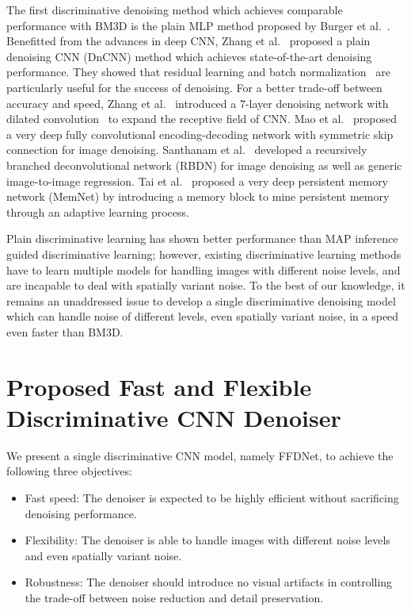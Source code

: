 \documentclass[journal]{IEEEtran}
\begin{document}
The first discriminative denoising method which achieves comparable performance with BM3D is the plain MLP method proposed by Burger et al.~\cite{burger2012image}.  Benefitted from the advances in deep CNN, Zhang et al.~\cite{zhang2017beyond} proposed a plain denoising CNN (DnCNN) method which achieves state-of-the-art denoising performance. They showed that residual learning and batch normalization~\cite{ioffe2015batch} are particularly useful for the success of denoising.
For a better trade-off between accuracy and speed, Zhang et al.~\cite{zhang2017learning} introduced a 7-layer denoising network with dilated convolution~\cite{yu2015multi} to expand the receptive field of CNN. Mao et al.~\cite{mao2016} proposed a very deep fully convolutional encoding-decoding network with symmetric skip connection for image denoising.
Santhanam et al.~\cite{santhanam2016generalized} developed a recursively branched deconvolutional network (RBDN) for image denoising as well as generic image-to-image regression.
Tai et al.~\cite{tai2017memnet} proposed a very deep persistent memory network (MemNet) by introducing a memory block to mine persistent memory through an adaptive learning process.


Plain discriminative learning has shown better performance than MAP inference guided discriminative learning; however, existing discriminative learning methods have to learn multiple models for handling images with different noise levels, and are incapable to deal with spatially variant noise. To the best of our knowledge, it remains an unaddressed issue to develop a single discriminative denoising model which can handle noise of different levels, even spatially variant noise, in a speed even faster than BM3D.


\section{Proposed Fast and Flexible Discriminative CNN Denoiser}
\label{sec:method}
We present a single discriminative CNN model, namely FFDNet, to achieve the following three objectives:
\begin{itemize}
\item Fast speed: The denoiser is expected to be highly efficient without sacrificing denoising performance.
\item Flexibility: The denoiser is able to handle images with different noise levels and even spatially variant noise.
\item Robustness: The denoiser should introduce no visual artifacts in controlling the trade-off between noise reduction and detail preservation.
\end{itemize}
\end{document}
